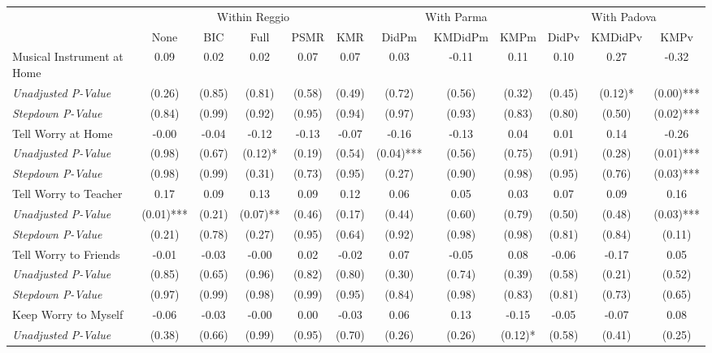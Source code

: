 \begin{tabular}{l c c c c c c c c c c c}
\toprule
& \multicolumn{5}{c}{Within Reggio} & \multicolumn{3}{c}{With Parma} & \multicolumn{3}{c}{With Padova} \\\cmidrule(lr){2-6} \cmidrule(lr){7-9} \cmidrule(lr){10-12}
 & None & BIC & Full & PSMR & KMR & DidPm & KMDidPm & KMPm & DidPv & KMDidPv & KMPv \\
\midrule
Musical Instrument at Home & 0.09 & 0.02 & 0.02 & 0.07 & 0.07 & 0.03 & -0.11 & 0.11 & 0.10 & 0.27 & -0.32 \\
\quad \textit{Unadjusted P-Value} & (0.26) & (0.85) & (0.81) & (0.58) & (0.49) & (0.72) & (0.56) & (0.32) & (0.45) & (0.12)* & (0.00)*** \\
\quad \textit{Stepdown P-Value} & (0.84) & (0.99) & (0.92) & (0.95) & (0.94) & (0.97) & (0.93) & (0.83) & (0.80) & (0.50) & (0.02)*** \\
Tell Worry at Home & -0.00 & -0.04 & -0.12 & -0.13 & -0.07 & -0.16 & -0.13 & 0.04 & 0.01 & 0.14 & -0.26 \\
\quad \textit{Unadjusted P-Value} & (0.98) & (0.67) & (0.12)* & (0.19) & (0.54) & (0.04)*** & (0.56) & (0.75) & (0.91) & (0.28) & (0.01)*** \\
\quad \textit{Stepdown P-Value} & (0.98) & (0.99) & (0.31) & (0.73) & (0.95) & (0.27) & (0.90) & (0.98) & (0.95) & (0.76) & (0.03)*** \\
Tell Worry to Teacher & 0.17 & 0.09 & 0.13 & 0.09 & 0.12 & 0.06 & 0.05 & 0.03 & 0.07 & 0.09 & 0.16 \\
\quad \textit{Unadjusted P-Value} & (0.01)*** & (0.21) & (0.07)** & (0.46) & (0.17) & (0.44) & (0.60) & (0.79) & (0.50) & (0.48) & (0.03)*** \\
\quad \textit{Stepdown P-Value} & (0.21) & (0.78) & (0.27) & (0.95) & (0.64) & (0.92) & (0.98) & (0.98) & (0.81) & (0.84) & (0.11) \\
Tell Worry to Friends & -0.01 & -0.03 & -0.00 & 0.02 & -0.02 & 0.07 & -0.05 & 0.08 & -0.06 & -0.17 & 0.05 \\
\quad \textit{Unadjusted P-Value} & (0.85) & (0.65) & (0.96) & (0.82) & (0.80) & (0.30) & (0.74) & (0.39) & (0.58) & (0.21) & (0.52) \\
\quad \textit{Stepdown P-Value} & (0.97) & (0.99) & (0.98) & (0.99) & (0.95) & (0.84) & (0.98) & (0.83) & (0.81) & (0.73) & (0.65) \\
Keep Worry to Myself & -0.06 & -0.03 & -0.00 & 0.00 & -0.03 & 0.06 & 0.13 & -0.15 & -0.05 & -0.07 & 0.08 \\
\quad \textit{Unadjusted P-Value} & (0.38) & (0.66) & (0.99) & (0.95) & (0.70) & (0.26) & (0.26) & (0.12)* & (0.58) & (0.41) & (0.25) \\

\end{tabular}
